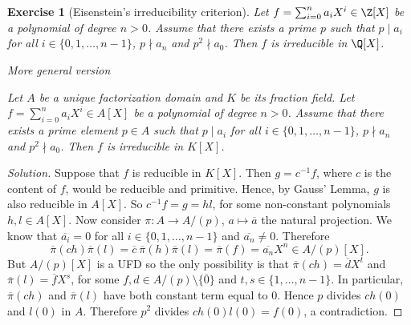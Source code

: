 \documentclass[a4paper,10pt,reqno]{amsart}
\newtheorem{ex}{Exercise}[section]
\newenvironment{sol}
  {\renewcommand\qedsymbol{$\blacksquare$}\begin{proof}[Solution]}
  {\end{proof}}
\begin{document}
\begin{ex} [Eisenstein's irreducibility criterion]
\label{3.3}
    Let $f=\sum_{i=0}^n a_iX^i\in \Z[X]$ be a polynomial of degree $n>0$. 
    Assume that there exists a prime $p$ such that
    $p\mid a_i$ for all $i\in\{0,1,\dots,n-1\}$, $p\nmid a_n$ and
    $p^2\nmid a_0$. Then $f$ is irreducible in $\Q[X]$.

    \vspace{.5cm}
    
    \textit{More general version}
    
    Let $A$ be a unique factorization domain and $K$ be its fraction field.
    Let $f=\sum_{i=0}^n a_iX^i\in A[X]$ be a polynomial of degree $n>0$. 
    Assume that there exists a prime element $p\in A$ such that
    $p\mid a_i$ for all $i\in\{0,1,\dots,n-1\}$, $p\nmid a_n$ and
    $p^2\nmid a_0$. Then $f$ is irreducible in $K[X]$. 
\end{ex}
\begin{sol}
    Suppose that $f$ is reducible in $K[X]$.
    Then $g=c^{-1}f$, where $c$ is the content of $f$,
    would be reducible and primitive.
    Hence, by Gauss' Lemma, $g$ is also 
    reducible in $A[X]$.
    So $c^{-1}f=g=hl$, for some non-constant polynomials $h,l\in A[X]$.
    Now consider $\pi:A\to A/(p)$, $a\mapsto \overline{a}$ the natural projection.
    We know that $\overline{a_i}=0$ for all 
    $i\in\{0,1,\dots, n-1\}$ and $\overline{a_n}\neq 0$.
    Therefore 
    \[
    \overline{\pi}(ch)\overline{\pi}(l)=\overline{c}\:\overline{\pi}(h)\overline{\pi}(l)=\overline{\pi}(f)=\overline{a_n}X^n\in  A/(p)[X].
    \]
    But $A/(p)[X]$ is a UFD so the only possibility
    is that $\overline{\pi}(ch)=\overline{d}X^t$ and $\overline{\pi}(l)=\overline{f}X^s$, for
    some $f,d\in A/(p)\setminus\{\overline{0}\}$
    and $t,s\in\{1,\dots, n-1\}$.
    In particular, $\overline{\pi}(ch)$ and $\overline{\pi}(l)$ have both constant term 
    equal to 0.
    Hence $p$ divides $ch(0)$ and $l(0)$ in $A$.
    Therefore $p^2$ divides $ch(0)l(0)=f(0)$,
    a contradiction.
\end{sol}
\end{document}
